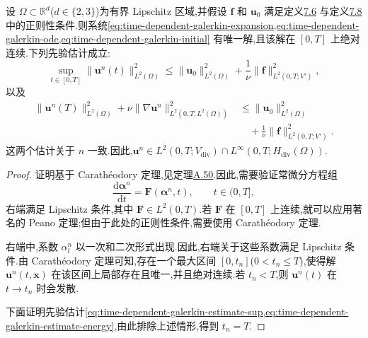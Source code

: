 \begin{lemma}[有限维问题的唯一可解性]\label{lem:time-dependent-galerkin-unique}
设 $\Omega\subset\mathbb{R}^d$($d\in\{2,3\}$)为有界 Lipschitz 区域,并假设 $\bm{f}$ 和 $\bm{u}_0$ 满足定义\hyperref[def:time-dependent-ns-weak-velocity]{7.6} 与定义\hyperref[def:time-dependent-ns-weak-solution]{7.8} 中的正则性条件.则系统\cref{eq:time-dependent-galerkin-expansion,eq:time-dependent-galerkin-ode,eq:time-dependent-galerkin-initial} 有唯一解,且该解在 $[0,T]$ 上绝对连续.下列先验估计成立:
\begin{equation}\label{eq:time-dependent-galerkin-estimate-sup}
  \sup_{t\in[0,T]}\lVert\bm{u}^n(t)\rVert_{L^2(\Omega)}^2
    \leq \lVert\bm{u}_0\rVert_{L^2(\Omega)}^2
      +\frac{1}{\nu}\lVert\bm{f}\rVert_{L^2(0,T;V')}^2,
\end{equation}
以及
\begin{equation}\label{eq:time-dependent-galerkin-estimate-energy}
\begin{aligned}
  \lVert\bm{u}^n(T)\rVert_{L^2(\Omega)}^2
    +\nu\lVert\nabla\bm{u}^n\rVert_{L^2(0,T;L^2(\Omega))}^2
    &\leq \lVert\bm{u}_0\rVert_{L^2(\Omega)}^2\\
    &\quad+\frac{1}{\nu}\lVert\bm{f}\rVert_{L^2(0,T;V')}^2.
\end{aligned}
\end{equation}
这两个估计关于 $n$ 一致.因此,$\bm{u}^n\in L^2(0,T;V_{\mathrm{div}})\cap L^\infty(0,T;H_{\mathrm{div}}(\Omega))$.
\begin{proof}
证明基于 Carathéodory 定理,见定理\hyperref[thm:appendix-a-50]{A.50}.因此,需要验证常微分方程组
\begin{equation}\label{eq:time-dependent-galerkin-coefficient-system}
  \frac{\mathrm{d}\symbf{\alpha}^n}{\mathrm{d}t}
    =\bm{F}(\symbf{\alpha}^n,t),\qquad t\in(0,T],
\end{equation}
右端满足 Lipschitz 条件,其中 $\bm{F}\in L^2(0,T)$.若 $\bm{F}$ 在 $[0,T]$ 上连续,就可以应用著名的 Peano 定理;但由于此处的正则性条件,需要使用 Carathéodory 定理.

右端中,系数 $\alpha_l^n$ 以一次和二次形式出现.因此,右端关于这些系数满足 Lipschitz 条件.由 Carathéodory 定理可知,存在一个最大区间 $[0,t_n]$($0<t_n\leq T$),使得解 $\bm{u}^n(t,\bm{x})$ 在该区间上局部存在且唯一,并且绝对连续.若 $t_n<T$,则 $\bm{u}^n(t)$ 在 $t\to t_n$ 时会发散.

下面证明先验估计\cref{eq:time-dependent-galerkin-estimate-sup,eq:time-dependent-galerkin-estimate-energy},由此排除上述情形,得到 $t_n=T$.


\end{proof}
\end{lemma}
